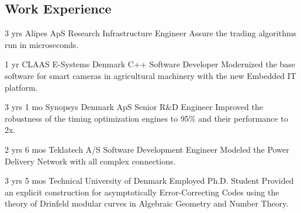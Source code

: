 \documentclass[11pt]{article} %
\begin{document}
\begin{paracol}{2}
\switchcolumn

\section{Work Experience}




{3 yrs} %
{Alipes ApS} %
{Research Infrastructure Engineer} %
{Assure the trading algorithms run in microseconds.
} %

{1 yr} %
{CLAAS E-Systems Denmark} %
{C++ Software Developer} %
{Modernized the base software for smart cameras in agricultural machinery with the new Embedded IT platform.
} %


{3 yrs 1 mo} %
{Synopsys Denmark ApS} %
{Senior R\&D Engineer} %
{Improved the robustness of the timing optimization engines to 95\% and their performance to 2x.
} %


{2 yrs 6 mos} %
{Teklatech A/S} %
{Software Development Engineer} %
{Modeled the Power Delivery Network with all complex connections.}  %


{3 yrs 5 mos} %
{Technical University of Denmark} %
{Employed Ph.D. Student} %
{Provided an explicit construction for asymptotically Error-Correcting Codes using the theory of Drinfeld modular curves in Algebraic Geometry and Number Theory.} %


\end{paracol}
\end{document}
